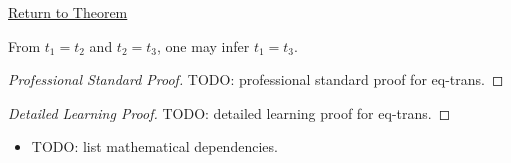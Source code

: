 \newpage
{}
\label{prf:eq-trans}

\begin{remark*}[Return]
\hyperref[thm:eq-trans]{Return to Theorem}
\end{remark*}

\begin{theorem*}
From $t_1 = t_2$ and $t_2 = t_3$, one may infer $t_1 = t_3$.
\end{theorem*}

\begin{proof}[Professional Standard Proof]
\LRAProofBodyStart
TODO: professional standard proof for eq-trans.
\end{proof}

\begin{proof}[Detailed Learning Proof]
\LRAProofBodyStart
TODO: detailed learning proof for eq-trans.
\end{proof}

\begin{remark*}
\end{remark*}

\begin{dependencies}
\begin{itemize}
  \item TODO: list mathematical dependencies.
\end{itemize}
\end{dependencies}

\clearpage
